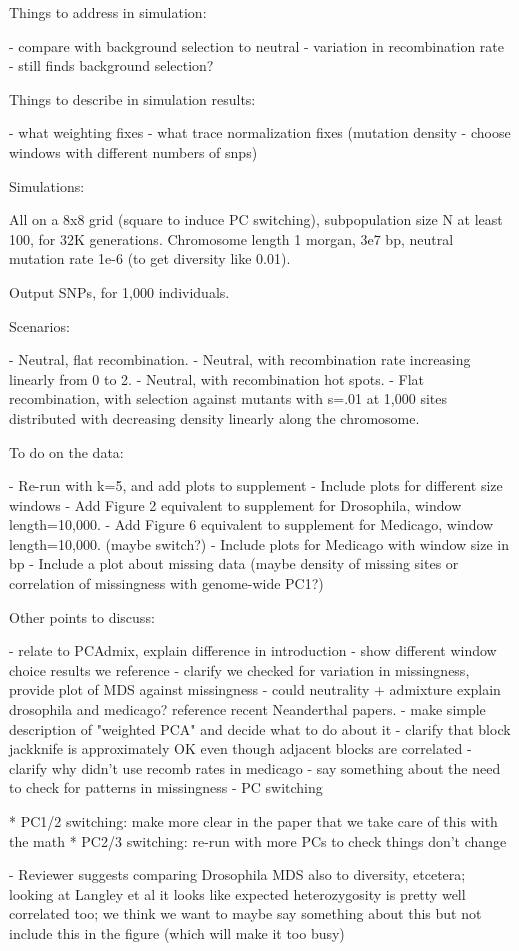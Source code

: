 Things to address in simulation:

- compare with background selection to neutral
- variation in recombination rate - still finds background selection?

Things to describe in simulation results:

- what weighting fixes
- what trace normalization fixes 
    (mutation density - choose windows with different numbers of snps)

Simulations:

All on a 8x8 grid (square to induce PC switching),
subpopulation size N at least 100, for 32K generations.
Chromosome length 1 morgan, 3e7 bp, neutral mutation rate 1e-6 (to get diversity like 0.01).

Output SNPs, for 1,000 individuals.

Scenarios:

- Neutral, flat recombination.
- Neutral, with recombination rate increasing linearly from 0 to 2.
- Neutral, with recombination hot spots.
- Flat recombination, with selection against mutants with s=.01 at 1,000 sites
    distributed with decreasing density linearly along the chromosome.


To do on the data:

- Re-run with k=5, and add plots to supplement
- Include plots for different size windows
- Add Figure 2 equivalent to supplement for Drosophila, window length=10,000.
- Add Figure 6 equivalent to supplement for Medicago, window length=10,000. (maybe switch?)
- Include plots for Medicago with window size in bp
- Include a plot about missing data 
    (maybe density of missing sites or correlation of missingness with genome-wide PC1?)


Other points to discuss:

- relate to PCAdmix, explain difference in introduction
- show different window choice results we reference
- clarify we checked for variation in missingness, provide plot of MDS against missingness
- could neutrality + admixture explain drosophila and medicago? reference recent Neanderthal papers.
- make simple description of "weighted PCA" and decide what to do about it 
- clarify that block jackknife is approximately OK even though adjacent blocks are correlated
- clarify why didn't use recomb rates in medicago
- say something about the need to check for patterns in missingness
- PC switching

    * PC1/2 switching: make more clear in the paper that we take care of this with the math
    * PC2/3 switching: re-run with more PCs to check things don't change

- Reviewer suggests comparing Drosophila MDS also to diversity, etcetera;
    looking at Langley et al it looks like expected heterozygosity is pretty well correlated too;
    we think we want to maybe say something about this but not include this in the figure
    (which will make it too busy)

